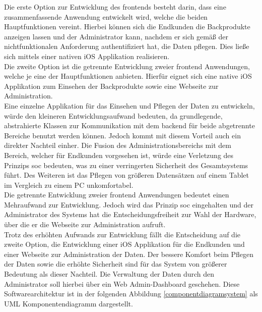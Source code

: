 Die erste Option zur Entwicklung des \gls{frontend}s besteht darin, dass eine zusammenfassende Anwendung entwickelt wird, welche die beiden Hauptfunktionen vereint. Hierbei können sich die Endkunden die Backprodukte anzeigen lassen und der Administrator kann, nachdem er sich gemäß der nichtfunktionalen Anforderung  authentifiziert hat, die Daten pflegen. Dies ließe sich mittels einer nativen iOS Applikation realisieren.
\\
Die zweite Option ist die getrennte Entwicklung zweier \gls{frontend} Anwendungen, welche je eine der Hauptfunktionen anbieten.
Hierfür eignet sich eine native iOS Applikation zum Einsehen der Backprodukte sowie eine Webseite zur Administration.
\\
Eine einzelne Applikation für das Einsehen und Pflegen der Daten zu entwickeln, würde den kleineren Entwicklungsaufwand bedeuten, da grundlegende, abstrahierte Klassen zur Kommunikation mit dem \gls{backend} für beide abgetrennte Bereiche benutzt werden können. Jedoch kommt mit diesem Vorteil auch ein direkter Nachteil einher. Die Fusion des Administrationsbereichs mit dem Bereich, welcher für Endkunden vorgesehen ist, würde eine Verletzung des Prinzips \gls{soc} bedeuten, was zu einer verringerten Sicherheit des Gesamtsystems führt. Des Weiteren ist das Pflegen von größeren Datensätzen auf einem Tablet im Vergleich zu einem PC unkomfortabel.
\\
Die getrennte Entwicklung zweier \gls{frontend} Anwendungen bedeutet einen Mehraufwand zur Entwicklung. Jedoch wird das Prinzip \gls{soc} eingehalten und der Administrator des Systems hat die Entscheidungsfreiheit zur Wahl der Hardware, über die er die Webseite zur Administration aufruft.
\\
Trotz des erhöhten Aufwands zur Entwicklung fällt die Entscheidung auf die zweite Option, die Entwicklung einer iOS Applikation für die Endkunden und einer Webseite zur Administration der Daten. Der bessere Komfort beim Pflegen der Daten sowie die erhöhte Sicherheit sind für das System von größerer Bedeutung als dieser Nachteil. Die Verwaltung der Daten durch den Administrator soll hierbei über ein Web Admin-Dashboard geschehen.
Diese Softwarearchitektur ist in der folgenden Abbildung \ref{componentdiagramsystem} als UML Komponentendiagramm dargestellt.


